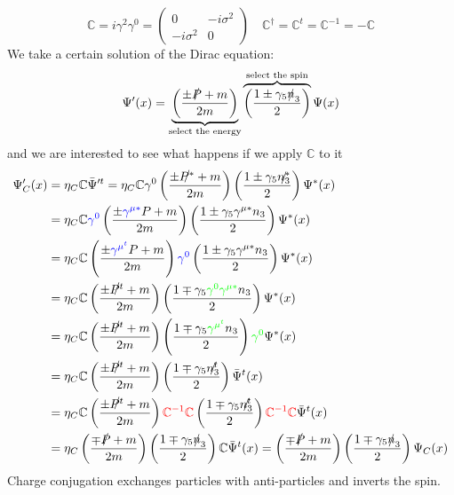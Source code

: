 \documentclass[../main.tex]{subfiles}
\begin{document}
\[
\mathbb{C}=i\gamma^2\gamma^0=\left(\begin{array}{cc}
    0 & -i\sigma^2 \\
    -i\sigma^2 & 0
\end{array}\right)
\quad \mathbb{C}^\dagger=\mathbb{C}^t=\mathbb{C}^{-1}=-\mathbb{C}
\]
We take a certain solution of the Dirac equation:
\[
\Psi'(x)=\underbrace{\left(\frac{\pm\slashed{P}+m}{2m}\right)}_{\text{select the energy}}\overbrace{\left(\frac{1\pm\gamma_5\slashed{n}_3}{2}\right)}^{\text{select the spin}}\Psi(x)
\]
and we are interested to see what happens if we apply $\mathbb{C}$ to it
\begin{align*}
\Psi'_C(x)&=\eta_C\mathbb{C}\bar{\Psi}'^t=\eta_C\mathbb{C}\gamma^0\left(\frac{\pm\slashed{P^*}+m}{2m}\right)\left(\frac{1\pm\gamma_5\slashed{n^*_3}}{2}\right)\Psi^*(x)\\
&=\eta_C\mathbb{C}{\color{blue}\gamma^0}\left(\frac{\pm{\color{blue}\gamma^{\mu*}}P+m}{2m}\right)\left(\frac{1\pm\gamma_5\gamma^{\mu*}n_3}{2}\right)\Psi^*(x)\\
&=\eta_C\mathbb{C}\left(\frac{\pm{\color{blue}\gamma^{\mu^t}}P+m}{2m}\right){\color{blue}\gamma^0}\left(\frac{1\pm\gamma_5\gamma^{\mu*}n_3}{2}\right)\Psi^*(x)\\
&=\eta_C\mathbb{C}\left(\frac{\pm\slashed{P^t}+m}{2m}\right)\left(\frac{1\mp\gamma_5{\color{green}\gamma^0\gamma^{\mu*}}n_3}{2}\right)\Psi^*(x)\\
&=\eta_C\mathbb{C}\left(\frac{\pm\slashed{P^t}+m}{2m}\right)\left(\frac{1\mp\gamma_5{\color{green}\gamma^{\mu^t}}n_3}{2}\right){\color{green}\gamma^0}\Psi^*(x)\\
&=\eta_C\mathbb{C}\left(\frac{\pm\slashed{P^t}+m}{2m}\right)\left(\frac{1\mp\gamma_5\slashed{n^t_3}}{2}\right)\bar{\Psi}^t(x)\\
&=\eta_C\mathbb{C}\left(\frac{\pm\slashed{P^t}+m}{2m}\right){\color{red}\mathbb{C}^{-1}\mathbb{C}}\left(\frac{1\mp\gamma_5\slashed{n^t_3}}{2}\right){\color{red}\mathbb{C}^{-1}\mathbb{C}}\bar{\Psi}^t(x)\\
&=\eta_C\left(\frac{\mp\slashed{P}+m}{2m}\right)\left(\frac{1\mp\gamma_5\slashed{n}_3}{2}\right)\mathbb{C}\bar{\Psi}^t(x)=\left(\frac{\mp\slashed{P}+m}{2m}\right)\left(\frac{1\mp\gamma_5\slashed{n}_3}{2}\right)\Psi_C(x)
\end{align*}
Charge conjugation exchanges particles with anti-particles and inverts the spin.
\end{document}
